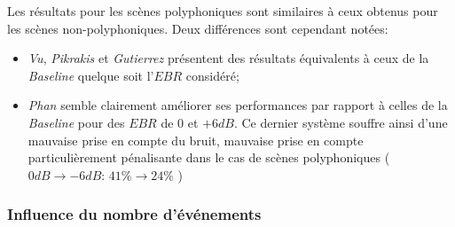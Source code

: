 Les résultats pour les scènes polyphoniques sont similaires à ceux obtenus pour les scènes non-polyphoniques. Deux différences sont cependant notées:

\begin{itemize}
\item  \emph{Vu}, \emph{Pikrakis} et \emph{Gutierrez} présentent des résultats équivalents à ceux de la \emph{Baseline} quelque soit l'$EBR$ considéré;
\item  \emph{Phan} semble clairement améliorer ses performances par rapport à celles de la \emph{Baseline} pour des $EBR$ de $0$ et $+6dB$. Ce dernier système souffre ainsi d'une mauvaise prise en compte du bruit, mauvaise prise en compte particulièrement pénalisante dans le cas de scènes polyphoniques ($0dB\rightarrow -6dB$: $41\%\rightarrow 24\%$ )
\end{itemize}

\subsubsection{Influence du nombre d'événements}


